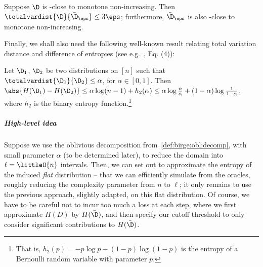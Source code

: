 \begin{corollary}\label{coro:birge:decomposition:robust}
  Suppose $\D$ is \eps-close to monotone non-increasing. Then $\totalvardist{\D}{\bar{\D}_\eps} \leq 3\eps$; furthermore,  $\bar{\D}_\eps$ is also \eps-close to monotone non-increasing.
\end{corollary}

Finally, we shall also need the following well-known result relating total variation distance and difference of entropies (see e.g.~\cite{Zhang:07}, Eq. (4)):
\begin{fact}\label{fact:tv:entropy}
Let $\D_1$, $\D_2$ be two distributions on $[n]$ such that $\totalvardist{\D_1}{\D_2} \leq \alpha$, for $\alpha\in[0,1]$. Then $\abs{H(\D_1)-H(\D_2)} \leq \alpha\log(n-1) +h_2(\alpha) \leq \alpha\log\frac{n}{\alpha} + (1-\alpha)\log\frac{1}{1-\alpha}$, where $h_2$ is the binary entropy function.\footnote{That is, $h_2(p)=-p\log p - (1-p)\log(1-p)$ is the entropy of a Bernoulli random variable with parameter $p$.}
\end{fact}

\subparagraph{High-level idea} Suppose we use the oblivious decomposition from~\cref{def:birge:obl:decomp}, with small parameter $\alpha$ (to be determined later), to reduce the domain into $\ell=\littleO{n}$ intervals. Then, we can set out to approximate the entropy of the induced \emph{flat} distribution -- that we can efficiently simulate from the \cdfsamp oracles, roughly reducing the complexity parameter from $n$ to $\ell$; it only remains to use the previous approach, slightly adapted, on this flat distribution. Of course, we have to be careful not to incur too much a loss at each step, where we first approximate $H(D)$ by $H(\bar{\D})$, and then specify our cutoff threshold to only consider significant contributions to $H(\bar{\D})$.

